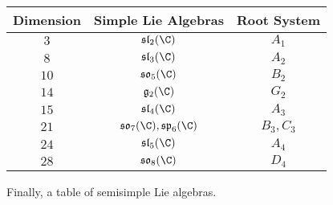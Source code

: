 \documentclass[a4paper]{article}
\begin{document}
\begin{table}[!h]
\centering
\begin{tabular}{|c|c|c|}
\hline
Dimension & Simple Lie Algebras                              & Root System \\ \hline
$3$       & $\mathfrak{sl}_2(\C)$                     & $A_1$       \\
$8$       & $\mathfrak{sl}_3(\C)$                     & $A_2$       \\
$10$      & $\mathfrak{so}_5(\C)$                     & $B_2$       \\
$14$      & $\mathfrak{g}_2(\C)$                     & $G_2$       \\
$15$      & $\mathfrak{sl}_4(\C)$                     & $A_3$       \\
$21$      & $\mathfrak{so}_7(\C),\mathfrak{sp}_6(\C)$ & $B_3,C_3$   \\
$24$      & $\mathfrak{sl}_5(\C)$                     & $A_4$       \\
$28$      & $\mathfrak{so}_8(\C)$                     & $D_4$       \\ \hline
\end{tabular}
\end{table}

Finally, a table of semisimple Lie algebras. 
\end{document}
